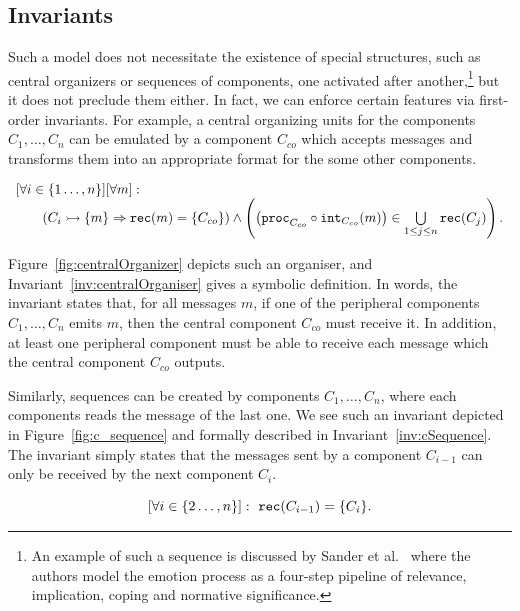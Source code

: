 \subsection{Invariants}

Such a model does not necessitate the existence of special structures, such as central organizers or sequences of components, one activated after another,\footnote{An example of such a sequence is discussed by Sander et al.\ \cite{DBLP:journals/nn/SanderGS05} where the authors model the emotion process as a four-step pipeline of relevance, implication, coping and normative significance.} but it does not preclude them either. In fact, we can enforce certain features via first-order invariants. For example, a central organizing units for the components $C_1,\dots,C_n$ can be emulated by a component $C_{co}$ which accepts messages and transforms them into an appropriate format for the some other components.

\begin{invariant}
	\label{inv:centralOrganiser}
	$$
	\begin{array}{l}
	[\forall i \in \{1\dots,n\}] [\forall m]:\\
	\quad \quad \left(C_i \rightarrowtail \{m\} \Rightarrow \mathtt{rec}(m) = \{C_{co}\}\right) \wedge \left( \left( \texttt{proc}_{C_{co}} \circ \texttt{int}_{C_{co}}(m)  \right) \in \bigcup\limits_{1 \leq j \leq n} \mathtt{rec}(C_j) \right).
	\end{array}
	$$
\end{invariant}

Figure~\ref{fig:centralOrganizer} depicts such an organiser, and Invariant~\ref{inv:centralOrganiser} gives a symbolic definition. In words, the invariant states that, for all messages $m$, if one of the peripheral components $C_1,\dots,C_n$ emits $m$, then the central component $C_{co}$ must receive it. In addition, at least one peripheral component must be able to receive each message which the central component $C_{co}$ outputs.

Similarly, sequences can be created by components $C_{1},\dots,C_{n}$, where each components reads the message of the last one. We see such an invariant depicted in Figure~\ref{fig:c_sequence} and formally described in Invariant~\ref{inv:cSequence}. The invariant simply states that the messages sent by a component $C_{i-1}$ can only be received by the next component $C_i$.

\begin{invariant}[Sequence]
	$$
	[\forall i \in \{2\dots,n\}]:\ \rec{C_{i-1}} = \{C_i\}.
	$$
\end{invariant}

